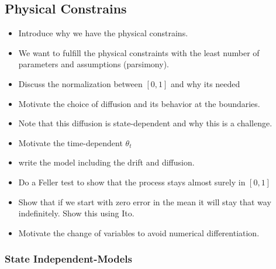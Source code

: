 \documentclass[10pt,twocolumn,letterpaper]{article}
\begin{document}
\subsection{Physical Constrains}

\begin{itemize}
    \item Introduce why we have the physical constrains.
    \item We want to fulfill the physical constraints with the least number of parameters and assumptions (parsimony).
    \item Discuss the normalization between $[0,1]$ and why its needed
\end{itemize}



\begin{itemize}
    \item Motivate the choice of diffusion and its behavior at the boundaries.
    \item Note that this diffusion is state-dependent and why this is a challenge.
\end{itemize}


\begin{itemize}
    \item Motivate the time-dependent  $\theta_t$
\end{itemize}

\begin{itemize}
    \item write the model including the drift and diffusion.
    \item Do a Feller test to show that the process stays almost surely in $[0,1]$
    \item Show that if we start with zero error in the mean it will stay that way indefinitely. Show this using Ito.

\end{itemize}


\begin{itemize}
    \item Motivate the change of variables to avoid numerical differentiation.
\end{itemize}



\subsubsection{State Independent-Models}
\end{document}

